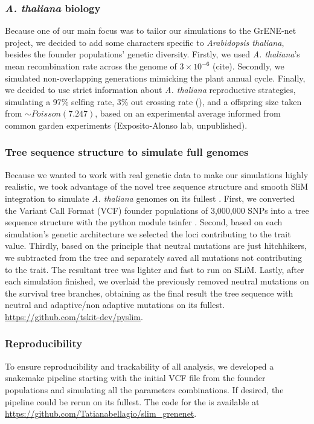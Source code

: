 \documentclass{article}
\begin{document}
\subsubsection{\textit{A. thaliana} biology}
Because one of our main focus was to tailor our simulations to the GrENE-net project, we decided to add some characters specific to \textit{Arabidopsis thaliana}, besides the founder populations' genetic diversity. Firstly, we used \textit{A. thaliana}'s mean recombination rate across the genome of $3 \times 10^{-6}$ (cite). Secondly, we simulated non-overlapping generations mimicking the plant annual cycle. Finally, we decided to use strict information about \textit{A. thaliana} reproductive strategies, simulating a 97\% selfing rate, 3\% out crossing rate (\citep{Platt2010-hy}), and a offspring size taken from $\sim Poisson(7.247)$,  based on an experimental average informed from common garden experiments (Exposito-Alonso lab, unpublished). 

\subsubsection{Tree sequence structure to simulate full genomes}

Because we wanted to work with real genetic data to make our simulations highly realistic, we took advantage of the novel tree sequence structure and smooth SliM integration to simulate \textit{A. thaliana} genomes on its fullest \citep{Kelleher2018-jb, Haller2019-lm}. First, we converted the Variant Call Format (VCF) founder populations of 3,000,000 SNPs  into a tree sequence structure with the python module tsinfer \citep{Kelleher2019-ev}. Second, based on each simulation's genetic architecture we selected the loci contributing to the trait value. Thirdly, based on the principle that neutral mutations are just hitchhikers, we subtracted from the tree and separately saved all mutations not contributing to the trait. The resultant tree was lighter and fast to run on SLiM. Lastly, after each simulation finished, we overlaid the previously removed neutral mutations on the survival tree branches, obtaining as the final result the tree sequence with neutral and adaptive/non adaptive mutations on its fullest. 
\url{https://github.com/tskit-dev/pyslim}. 

\subsubsection{Reproducibility}
To ensure reproducibility and trackability of all analysis, we developed a snakemake pipeline \citep{Molder2021-ho}  starting with the initial VCF file from the founder populations and simulating all the parameters combinations. If desired, the pipeline could be rerun on its fullest. The code for the is available at \url{https://github.com/Tatianabellagio/slim_grenenet}.
\end{document}
